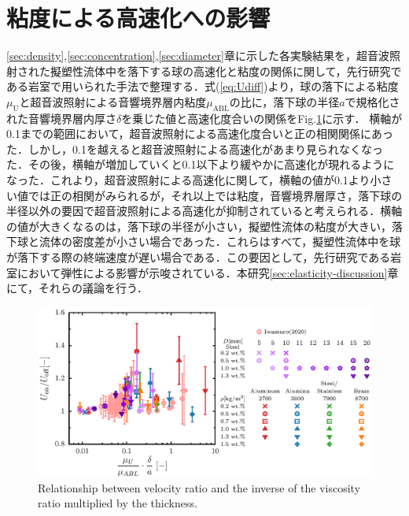 \section{粘度による高速化への影響}
\label{sec:viscosity}
\ref{sec:density},\ref{sec:concentration},\ref{sec:diameter}章に示した各実験結果を，超音波照射された擬塑性流体中を落下する球の高速化と粘度の関係に関して，先行研究である岩室\cite{ref:8}で用いられた手法で整理する．式(\ref{eq:Udiff})より，球の落下による粘度$\mu_\text{U}$と超音波照射による音響境界層内粘度$\mu_\text{ABL}$の比に，落下球の半径$a$で規格化された音響境界層内厚さ$\delta$を乗じた値と高速化度合いの関係をFig.\ref{fig:viscosity_ratio}に示す．
横軸が0.1までの範囲において，超音波照射による高速化度合いと正の相関関係にあった．しかし，0.1を越えると超音波照射による高速化があまり見られなくなった．その後，横軸が増加していくと0.1以下より緩やかに高速化が現れるようになった．これより，超音波照射による高速化に関して，横軸の値が0.1より小さい値では正の相関がみられるが，それ以上では粘度，音響境界層厚さ，落下球の半径以外の要因で超音波照射による高速化が抑制されていると考えられる．横軸の値が大きくなるのは，落下球の半径が小さい，擬塑性流体の粘度が大きい，落下球と流体の密度差が小さい場合であった．これらはすべて，擬塑性流体中を球が落下する際の終端速度が遅い場合である．この要因として，先行研究である岩室\cite{ref:8}において弾性による影響が示唆されている．本研究\ref{sec:elasticity-discussion}章にて，それらの議論を行う．

\begin{figure}[ht]
    \centering
    \includegraphics[width=1.0\textwidth]{5-Results/viscosity.eps}
    \caption{Relationship between velocity ratio and the inverse of the viscosity ratio multiplied by the thickness.}
    \label{fig:viscosity_ratio}
\end{figure}
